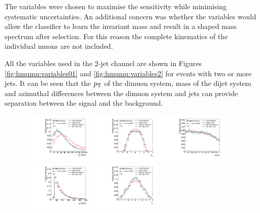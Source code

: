 The variables were chosen to maximise the sensitivity while
minimising systematic uncertainties. An additional concern was
whether the variables would allow the classifier to learn the
invariant mass and result in a shaped mass spectrum after selection.
For this reason the complete kinematics of the individual muons
are not included.

All the variables used in the 2-jet channel are shown in Figures
\ref{fig:hmumu:variables01} and \ref{fig:hmumu:variables2} for
events with two or more jets. It can be seen that the $p_{\text{T}}$ of
the dimuon system, mass of the dijet system and azimuthal
differences between the dimuon system and jets can provide
separation between the signal and the background.

\begin{figure}[h!]
  \centering
  \includegraphics[width=0.3\textwidth]{figures/hmumu/vars/Z_PT_FSR}
  \includegraphics[width=0.3\textwidth]{figures/hmumu/vars/Z_Y_FSR}
  \includegraphics[width=0.3\textwidth]{figures/hmumu/vars/CosThetaStar} \\ 
  \includegraphics[width=0.3\textwidth]{figures/hmumu/vars/Jets_PT_Lead}
  \includegraphics[width=0.3\textwidth]{figures/hmumu/vars/Jets_Eta_Lead}

\end{figure}
